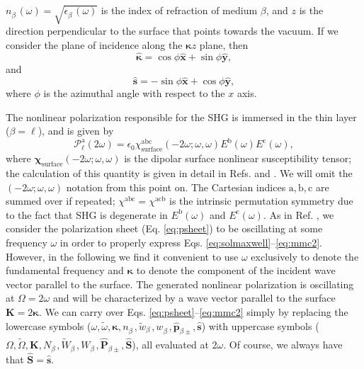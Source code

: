 \documentclass[aps,pra,10pt,amsmath,twocolumn,letterpaper]{revtex4-1}
\begin{document}
$n^{\phantom{A}}_{\beta}(\omega)=\sqrt{\epsilon^{\phantom{A}}_{\beta}(\omega)}$
is the index of refraction of medium $\beta$, and $z$ is the direction
perpendicular to the surface that points towards the vacuum. If we consider the
plane of incidence along the $\boldsymbol{\kappa}z$ plane, then
\begin{equation}\label{eq:mc1}
\hat{\boldsymbol{\kappa}} = \cos\phi\hat{\mathbf{x}} + \sin\phi\hat{\mathbf{y}},
\end{equation}
and
\begin{equation}\label{eq:mmc2}
\hat{\mathbf{s}} = -\sin\phi\hat{\mathbf{x}} + \cos\phi\hat{\mathbf{y}},
\end{equation}
where $\phi$ is the azimuthal angle with respect to the $x$ axis.

The nonlinear polarization responsible for the SHG is immersed in the thin layer
($\beta=\ell$), and is given by
\begin{equation}\label{eq:tres}
\mathcal{P}^{\mathrm{a}}_{\ell}(2\omega) =
\epsilon_{0}\chi^{\mathrm{abc}}_{\mathrm{surface}}(-2\omega;\omega,\omega)
    E^{\mathrm{b}}(\omega)E^{\mathrm{c}}(\omega)
,
\end{equation}
where $\boldsymbol{\chi}_{\mathrm{surface}}(-2\omega;\omega,\omega)$ is the
dipolar surface nonlinear susceptibility tensor; the calculation of this
quantity is given in detail in Refs. \cite{andersonthesis} and
\cite{andersonPRB15}. We will omit the $(-2\omega;\omega,\omega)$ notation from
this point on. The Cartesian indices $\mathrm{a,b,c}$ are summed over if
repeated; $\chi^{\mathrm{abc}} = \chi^{\mathrm{acb}}$ is the intrinsic
permutation symmetry due to the fact that SHG is degenerate in
$E^{\mathrm{b}}(\omega)$ and $E^{\mathrm{c}}(\omega)$. As in Ref.
\cite{mizrahiJOSA88}, we consider the polarization sheet (Eq. \eqref{eq:psheet})
to be oscillating at some frequency $\omega$ in order to properly express Eqs.
\eqref{eq:solmaxwell}--\eqref{eq:mmc2}. However, in the following we find it
convenient to use $\omega$ exclusively to denote the fundamental frequency and
$\boldsymbol{\kappa}$ to denote the component of the incident wave vector
parallel to the surface. The generated nonlinear polarization is oscillating at
$\Omega = 2\omega$ and will be characterized by a wave vector parallel to the
surface $\mathbf{K} = 2\boldsymbol{\kappa}$. We can carry over Eqs.
\eqref{eq:psheet}--\eqref{eq:mmc2} simply by replacing the lowercase symbols
($\omega,\tilde{\omega},\boldsymbol{\kappa},n^{\phantom{A}}_{\beta},
\tilde{w}^{\phantom{A}}_{\beta},w^{\phantom{A}}_{\beta},
\hat{\mathbf{p}}^{\phantom{A}}_{\beta\pm},\hat{\mathbf{s}}$) with uppercase
symbols ($\Omega,\tilde{\Omega},\mathbf{K},N^{\phantom{A}}_{\beta},
\tilde{W}^{\phantom{A}}_{\beta},W^{\phantom{A}}_{\beta},
\hat{\mathbf{P}}_{\beta\pm},\hat{\mathbf{S}}$), all evaluated at $2\omega$. Of
course, we always have that $\hat{\mathbf{S}}=\hat{\mathbf{s}}$.
\end{document}
